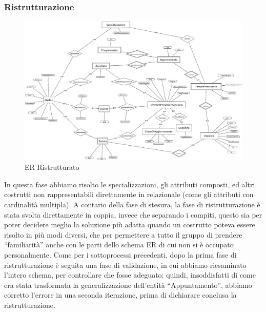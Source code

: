 \documentclass[11pt]{article}
\begin{document}
\subsubsection{Ristrutturazione}
\begin{figure}[H]
    \includegraphics[width=\linewidth]{images/ER_Ristrutturato2.png}
    \caption{ER Ristrutturato}
    \label{fig:ER_Ristrutturato}
\end{figure}
In questa fase abbiamo risolto le specializzazioni, gli attributi composti, ed altri costrutti non rappresentabili direttamente in relazionale (come gli attributi con cardinalità multipla). A contario della fase di stesura, la fase di ristrutturazione è stata svolta direttamente in coppia, invece che separando i compiti, questo sia per poter decidere meglio la soluzione più adatta quando un costrutto poteva essere risolto in più modi diversi, che per permettere a tutto il gruppo di prendere ``familiarità'' anche con le parti dello schema ER di cui non si è occupato personalmente.
Come per i sottoprocessi precedenti, dopo la prima fase di ristrutturazione è seguita una fase di validazione, in cui abbiamo riesaminato l'intero schema, per controllare che fosse adeguato; quindi, insoddisfatti di come era stata trasformata la generalizzazione dell'entità ``Appuntamento'', abbiamo corretto l'errore in una seconda iterazione, prima di dichiarare conclusa la ristrutturazione.
\end{document}

